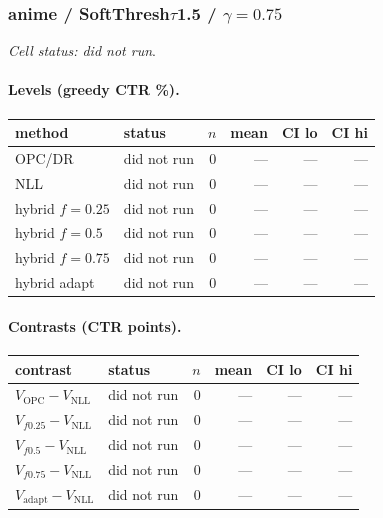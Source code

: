 \documentclass[10pt,a4paper]{article}
\begin{document}
\subsubsection{anime / SoftThresh$\tau$1.5 / $\gamma=0.75$}
\emph{Cell status: did not run}.
\paragraph{Levels (greedy CTR \%).}
{\centering\small\begin{tabular}{llrrrr}
\toprule method & status & $n$ & mean & CI lo & CI hi \\
\midrule
OPC/DR & did not run & 0 & --- & --- & --- \\
NLL & did not run & 0 & --- & --- & --- \\
hybrid $f{=}0.25$ & did not run & 0 & --- & --- & --- \\
hybrid $f{=}0.5$ & did not run & 0 & --- & --- & --- \\
hybrid $f{=}0.75$ & did not run & 0 & --- & --- & --- \\
hybrid adapt & did not run & 0 & --- & --- & --- \\
\bottomrule\end{tabular}\par}
\paragraph{Contrasts (CTR points).}
{\centering\small\begin{tabular}{llrrrr}
\toprule contrast & status & $n$ & mean & CI lo & CI hi \\
\midrule
$V_{\mathrm{OPC}}-V_{\mathrm{NLL}}$ & did not run & 0 & --- & --- & --- \\
$V_{f0.25}-V_{\mathrm{NLL}}$ & did not run & 0 & --- & --- & --- \\
$V_{f0.5}-V_{\mathrm{NLL}}$ & did not run & 0 & --- & --- & --- \\
$V_{f0.75}-V_{\mathrm{NLL}}$ & did not run & 0 & --- & --- & --- \\
$V_{\mathrm{adapt}}-V_{\mathrm{NLL}}$ & did not run & 0 & --- & --- & --- \\
\bottomrule\end{tabular}\par}
\end{document}
